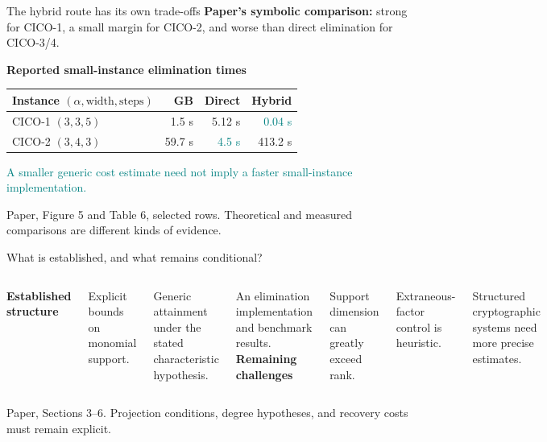 \documentclass[aspectratio=169,11pt,professionalfonts]{beamer}
\newcommand{\src}[1]{\vfill{\color{Muted}\fontsize{7}{8.5}\selectfont #1\par}}
\newcommand{\gap}{\par\vspace{3mm}}
\begin{document}
\begin{frame}{The hybrid route has its own trade-offs}
\textbf{Paper's symbolic comparison:} strong for CICO-1, a small margin for CICO-2, and worse than direct elimination for CICO-3/4.\par
\vspace{4mm}\textbf{Reported small-instance elimination times}\gap
\renewcommand{\arraystretch}{1.5}
\begin{tabular}{@{}L{5.3cm}rrr@{}}
\toprule\textbf{Instance $(\alpha,\mathrm{width},\mathrm{steps})$}&\textbf{GB}&\textbf{Direct}&\textbf{Hybrid}\\\midrule
CICO-1 $(3,3,5)$&1.5 s&5.12 s&\textcolor{Teal}{0.04 s}\\
CICO-2 $(3,4,3)$&59.7 s&\textcolor{Teal}{4.5 s}&413.2 s\\\bottomrule
\end{tabular}\par\vspace{4mm}
\textcolor{Teal}{A smaller generic cost estimate need not imply a faster small-instance implementation.}
\src{Paper, Figure 5 and Table 6, selected rows. Theoretical and measured comparisons are different kinds of evidence.}
\end{frame}

\begin{frame}{What is established, and what remains conditional?}
\begin{columns}[T,onlytextwidth]
\textbf{Established structure}\gap Explicit bounds on monomial support.\gap
Generic attainment under the stated characteristic hypothesis.\gap
An elimination implementation and benchmark results.
\textbf{Remaining challenges}\gap Support dimension can greatly exceed rank.\gap
Extraneous-factor control is heuristic.\gap
Structured cryptographic systems need more precise estimates.
\end{columns}
\src{Paper, Sections 3--6. Projection conditions, degree hypotheses, and recovery costs must remain explicit.}
\end{frame}
\end{document}
